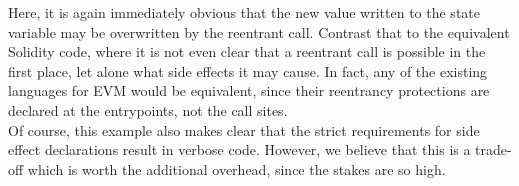 Here, it is again immediately obvious that the new value written to the state variable may be overwritten by the reentrant call. Contrast that to the equivalent Solidity code, where it is not even clear that a reentrant call is possible in the first place, let alone what side effects it may cause. In fact, any of the existing languages for EVM would be equivalent, since their reentrancy protections are declared at the entrypoints, not the call sites.\\
Of course, this example also makes clear that the strict requirements for side effect declarations result in verbose code. However, we believe that this is a trade-off which is worth the additional overhead, since the stakes are so high. 





















